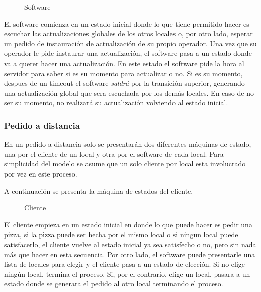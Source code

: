 \documentclass[a4paper,10pt]{article}
\begin{document}
\begin{figure}[H]
\centering
{}
\caption{Software}
\end{figure}


El software comienza en un estado inicial donde lo que tiene permitido hacer es escuchar las actualizaciones globales de los otros locales o, por otro lado, esperar un pedido de instauraci\'on de actualizaci\'on de su propio operador. Una vez que su operador le pide instaurar una actualizaci\'on, el software pasa a un estado donde va a querer hacer una actualizaci\'on. En este estado el software pide la hora al servidor para saber si es su momento para actualizar o no. Si es su momento, despues de un timeout el software \emph{saldr\'a} por la transici\'on superior, generando una actualizaci\'on global que sera escuchada por los dem\'as locales. En caso de no ser su momento, no realizar\'a su actualizaci\'on volviendo al estado inicial.



\subsubsection*{Pedido a distancia}

En un pedido a distancia solo se presentar\'an dos diferentes m\'aquinas de estado, una por el cliente de un local y otra por el software de cada local. Para simplicidad del modelo se asume que un solo cliente por local esta involucrado por vez en este proceso.

A continuaci\'on se presenta la m\'aquina de estados del cliente.

\begin{figure}[H]
\centering
{}
\caption{Cliente}
\end{figure}

El cliente empieza en un estado inicial en donde lo que puede hacer es pedir una pizza, si la pizza puede ser hecha por el mismo local o si ningun local puede satisfacerlo, el cliente vuelve al estado inicial ya sea satisfecho o no, pero sin nada m\'as que hacer en esta secuencia. Por otro lado, el software puede presentarle una lista de locales para elegir y el cliente pasa a un estado de elecci\'on. Si no elige ning\'un local, termina el proceso. Si, por el contrario, elige un local, pasara a un estado donde se generara el pedido al otro local terminando el proceso.
\end{document}
